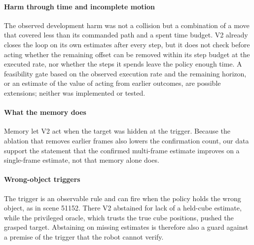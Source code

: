 \paragraph{Harm through time and incomplete motion} The observed development harm was not a collision but a combination of a move that covered less than its commanded path and a spent time budget. V2 already closes the loop on its own estimates after every step, but it does not check before acting whether the remaining offset can be removed within its step budget at the executed rate, nor whether the steps it spends leave the policy enough time. A feasibility gate based on the observed execution rate and the remaining horizon, or an estimate of the value of acting from earlier outcomes, are possible extensions; neither was implemented or tested.

\paragraph{What the memory does} Memory let V2 act when the target was hidden at the trigger. Because the ablation that removes earlier frames also lowers the confirmation count, our data support the statement that the confirmed multi-frame estimate improves on a single-frame estimate, not that memory alone does.

\paragraph{Wrong-object triggers} The trigger is an observable rule and can fire when the policy holds the wrong object, as in scene 51152. There V2 abstained for lack of a held-cube estimate, while the privileged oracle, which trusts the true cube positions, pushed the grasped target. Abstaining on missing estimates is therefore also a guard against a premise of the trigger that the robot cannot verify.
